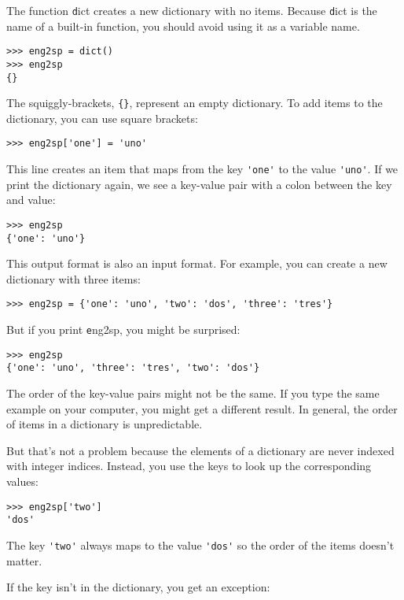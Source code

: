 \documentclass[
DIV=11,
fontsize=12,
twoside,
headinclude=false,
titlepage=firstiscover,
abstract=true,
headsepline=true,
footsepline=true,
chapterprefix=true, %
headings=big,
bibliography=totoc,%
captions=tableheading
]{scrbook}
\theoremstyle{definition}
\begin{document}
The function {\texttt dict} creates a new dictionary with no items.
Because {\texttt dict} is the name of a built-in function, you
should avoid using it as a variable name.

\begin{lstlisting}
>>> eng2sp = dict()
>>> eng2sp
{}
\end{lstlisting}

The squiggly-brackets, \verb"{}", represent an empty dictionary.
To add items to the dictionary, you can use square brackets:

\begin{lstlisting}
>>> eng2sp['one'] = 'uno'
\end{lstlisting}
%
This line creates an item that maps from the key
\verb"'one'" to the value \verb"'uno'".  If we print the
dictionary again, we see a key-value pair with a colon
between the key and value:

\begin{lstlisting}
>>> eng2sp
{'one': 'uno'}
\end{lstlisting}
%
This output format is also an input format.  For example,
you can create a new dictionary with three items:

\begin{lstlisting}
>>> eng2sp = {'one': 'uno', 'two': 'dos', 'three': 'tres'}
\end{lstlisting}
%
But if you print {\texttt eng2sp}, you might be surprised:

\begin{lstlisting}
>>> eng2sp
{'one': 'uno', 'three': 'tres', 'two': 'dos'}
\end{lstlisting}
%
The order of the key-value pairs might not be the same.  If
you type the same example on your computer, you might get a
different result.  In general, the order of items in
a dictionary is unpredictable.

But that's not a problem because
the elements of a dictionary are never indexed with integer indices.
Instead, you use the keys to look up the corresponding values:

\begin{lstlisting}
>>> eng2sp['two']
'dos'
\end{lstlisting}
%
The key \verb"'two'" always maps to the value \verb"'dos'" so the order
of the items doesn't matter.

If the key isn't in the dictionary, you get an exception:
\end{document}
